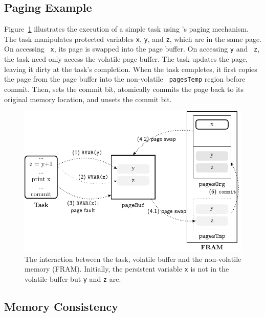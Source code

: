 \subsection{Paging Example}
Figure~\ref{fig:volatile-buffer} illustrates the execution of a simple task
using \sys's paging mechanism.  The task manipulates protected variables
{\tt x}, {\tt y}, and {\tt z}, which are in the same page.  On accessing {\tt
x}, its page is swapped into the page buffer.  On accessing {\tt y} and {\tt
z}, the task need only access the volatile page buffer.  The task updates the
page, leaving it dirty at the task's completion.  When the task completes, it
first copies the page from the page buffer into the non-volatile {\tt
pagesTemp} region before commit.  Then, \sys sets the commit bit, 
atomically commits the page back to its original memory location, and unsets
the commit bit.

\begin{figure}[t]
	\centering
	\includegraphics[width=\columnwidth]{figures/sram-buffer}
	\caption{The interaction between the task, volatile buffer and the non-volatile memory (FRAM). Initially, the persistent variable \texttt{x} is not in the volatile buffer but \texttt{y} and \texttt{z} are.}
	\label{fig:volatile-buffer}
\end{figure}


\subsection{Memory Consistency}

